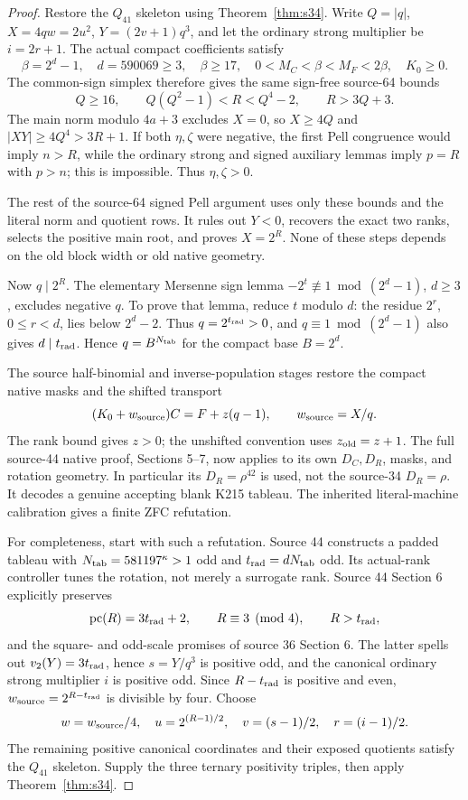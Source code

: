 \documentclass[11pt,a4paper]{article}
\theoremstyle{definition}
\newcommand{\MC}{M_C}
\newcommand{\MF}{M_F}
\begin{document}
\begin{proof}
Restore the \(Q_{41}\) skeleton using Theorem~\ref{thm:s34}.
Write \(Q=|q|\), \(X=4qw=2u^2\), \(Y=(2v+1)q^3\),
and let the ordinary strong multiplier be \(i=2r+1\).
The actual compact coefficients satisfy
\[
 \beta=2^d-1,\quad d=590069\ge3,\quad
 \beta\ge17,\quad0<\MC<\beta<\MF<2\beta,\quad K_0\ge0.
\]
The common-sign simplex therefore gives the same sign-free
source-64 bounds
\[
 Q\ge16,\qquad Q(Q^2-1)<R<Q^4-2,\qquad R>3Q+3.
\]
The main norm modulo \(4a+3\) excludes \(X=0\), so
\(X\ge4Q\) and \(|XY|\ge4Q^4>3R+1\).
If both \(\eta,\zeta\) were negative, the first Pell
congruence would imply \(n>R\), while the ordinary strong
and signed auxiliary lemmas imply \(p=R\) with \(p>n\);
this is impossible. Thus \(\eta,\zeta>0\).

The rest of the source-64 signed Pell argument uses only these
bounds and the literal norm and quotient rows. It rules out
\(Y<0\), recovers the exact two ranks, selects the positive
main root, and proves \(X=2^R\). None of these steps depends
on the old block width or old native geometry.

Now \(q\mid2^R\). The elementary Mersenne sign lemma
\(-2^t\not\equiv1\bmod(2^d-1)\), \(d\ge3\), excludes
negative \(q\). To prove that lemma, reduce \(t\) modulo \(d\):
the residue \(2^r\), \(0\le r<d\), lies below \(2^d-2\).
Thus \(q=2^{t_{\rm rad}}>0\), and \(q\equiv1\bmod(2^d-1)\)
also gives \(d\mid t_{\rm rad}\). Hence \(q=B^{N_{\rm tab}}\) for
the compact base \(B=2^d\).

The source half-binomial and inverse-population stages restore
the compact native masks and the shifted transport
\[
 (K_0+w_{\rm source})C=F+z(q-1),\qquad
 w_{\rm source}=X/q.
\]
The rank bound gives \(z>0\); the unshifted convention uses
\(z_{\rm old}=z+1\).
The full source-44 native proof, Sections 5--7, now applies
to its own \(D_C,D_R\), masks, and rotation geometry.
In particular its \(D_R=\rho^{42}\) is used, not the
source-34 \(D_R=\rho\). It decodes a genuine accepting blank
K215 tableau. The inherited literal-machine calibration gives
a finite ZFC refutation.

For completeness, start with such a refutation. Source 44
constructs a padded tableau with
\(N_{\rm tab}=581197^\kappa>1\) odd and
\(t_{\rm rad}=dN_{\rm tab}\) odd.
Its actual-rank controller tunes the rotation, not merely a
surrogate rank. Source 44 Section 6 explicitly preserves
\[
 \operatorname{pc}(R)=3t_{\rm rad}+2,\qquad
 R\equiv3\pmod4,\qquad R>t_{\rm rad},
\]
and the square- and odd-scale promises of source 36 Section 6.
The latter spells out \(v_2(Y)=3t_{\rm rad}\), hence
\(s=Y/q^3\) is positive odd, and the canonical ordinary
strong multiplier \(i\) is positive odd.
Since \(R-t_{\rm rad}\) is positive and even,
\(w_{\rm source}=2^{R-t_{\rm rad}}\) is divisible by four.
Choose
\[
 w=w_{\rm source}/4,\quad
 u=2^{(R-1)/2},\quad v=(s-1)/2,\quad r=(i-1)/2.
\]
The remaining positive canonical coordinates and their exposed
quotients satisfy the \(Q_{41}\) skeleton. Supply the three
ternary positivity triples, then apply Theorem~\ref{thm:s34}.
\end{proof}
\end{document}
